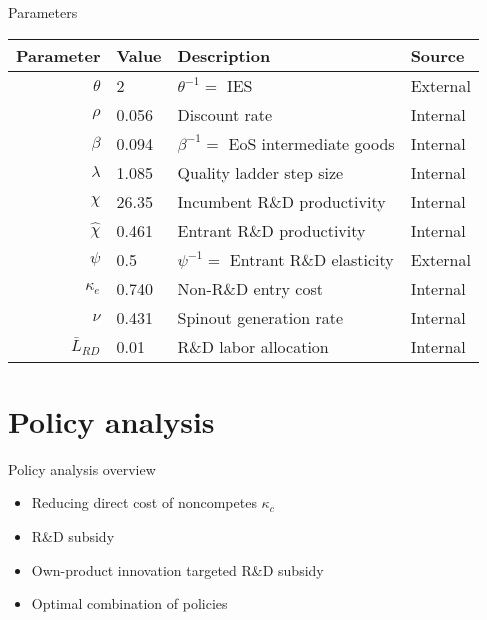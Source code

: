\documentclass[english,usenames,dvipsnames]{beamer}
\begin{document}
\begin{frame}{Parameters}\label{parameters}
\begin{table}[]
	\footnotesize
	\centering
	\label{calibration_parameters}
	\begin{tabular}{rlll}
		\toprule \toprule
		Parameter & Value & Description & Source \tabularnewline
		\midrule
		$\theta$ & 2 & $\theta^{-1} = $ IES & External
		\tabularnewline
		$\rho$ & 0.056 & Discount rate  & Internal \tabularnewline
		$\beta$ & 0.094 & $\beta^{-1} = $ EoS intermediate goods & Internal \tabularnewline 
		$\lambda$ & 1.085 & Quality ladder step size & Internal
		\tabularnewline
		$\chi$ & 26.35 & Incumbent R\&D productivity & Internal
		\tabularnewline
		$\hat{\chi}$ & 0.461 & Entrant R\&D productivity & Internal \tabularnewline 
		$\psi$ & 0.5 & $\psi^{-1} = $ Entrant R\&D elasticity & External \tabularnewline
		$\kappa_e$ & 0.740 & Non-R\&D entry cost & Internal \tabularnewline
		$\nu$ & 0.431 & Spinout generation rate  & Internal \tabularnewline
		$\bar{L}_{RD}$ & 0.01 & R\&D labor allocation  & Internal \tabularnewline
		\bottomrule
	\end{tabular}
\end{table}
\hyperlink{identification}{} 
\end{frame}

\section{Policy analysis}

\begin{frame}
\tableofcontents[currentsection]
\end{frame}

\begin{frame}{Policy analysis overview}
	\begin{itemize}
		\item Reducing direct cost of noncompetes $\kappa_c$
		\smallskip
		\item R\&D subsidy
		\smallskip
		\item Own-product innovation targeted R\&D subsidy
		\smallskip
		\item Optimal combination of policies
	\end{itemize}
\end{frame}
\end{document}
